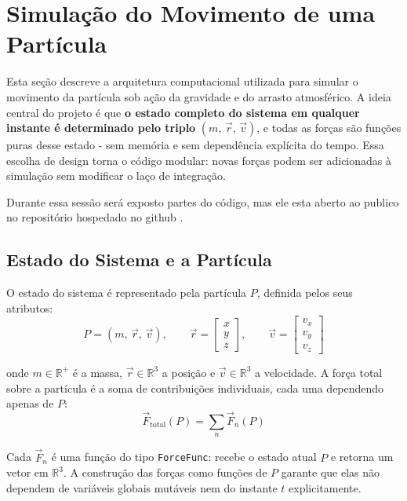 \section{Simulação do Movimento de uma Partícula}
\label{sec:simulacao}

Esta seção descreve a arquitetura computacional utilizada para simular o movimento da partícula sob ação da gravidade e do arrasto atmosférico. A ideia central do projeto é que \textbf{o estado completo do sistema em qualquer instante é determinado pelo triplo} $(m,\,\vec{r},\,\vec{v})$, e todas as forças são funções puras desse estado - sem memória e sem dependência explícita do tempo. Essa escolha de design torna o código modular: novas forças podem ser adicionadas à simulação sem modificar o laço de integração.

Durante essa sessão será exposto partes do código, mas ele esta aberto ao publico no repositório hospedado no github \cite{mecanica-geral-repo-2026}.

\subsection{Estado do Sistema e a Partícula}

O estado do sistema é representado pela partícula $P$, definida pelos seus atributos:
\begin{equation}
    P = (m,\,\vec{r},\,\vec{v}), \qquad
    \vec{r} = \begin{bmatrix}x\\y\\z\end{bmatrix}, \qquad
    \vec{v} = \begin{bmatrix}v_x\\v_y\\v_z\end{bmatrix}
\end{equation}

onde $m \in \mathbb{R}^+$ é a massa, $\vec{r} \in \mathbb{R}^3$ a posição e $\vec{v} \in \mathbb{R}^3$ a velocidade. A força total sobre a partícula é a soma de contribuições individuais, cada uma dependendo apenas de $P$:
\begin{equation}
    \vec{F}_\text{total}(P) = \sum_n \vec{F}_n(P)
\end{equation}

Cada $\vec{F}_n$ é uma função do tipo \texttt{ForceFunc}: recebe o estado atual $P$ e retorna um vetor em $\mathbb{R}^3$. A construção das forças como funções de $P$ garante que elas não dependem de variáveis globais mutáveis nem do instante $t$ explicitamente.

